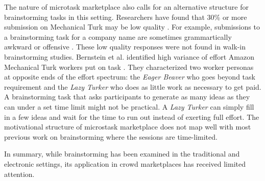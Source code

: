 The nature of microtask marketplace also calls for an alternative structure for brainstorming tasks in this setting. Researchers have found that 30\% or more submission on Mechanical Turk may be low quality \cite{kittur2008crowdsourcing}. For example, submissions to a brainstorming task for a company name are sometimes grammartically awkward or offensive \cite{little2010exploring}. These low quality responses were not found in walk-in brainstorming studies. Bernstein et al. identified high variance of effort Amazon Mechanical Turk workers put on task \cite{soylent}. They characterized two worker personas at opposite ends of the effort spectrum: the {\em Eager Beaver\/} who goes beyond task requirement and the {\em Lazy Turker\/} who does as little work as necessary to get paid. A brainstorming task that asks participants to generate as many ideas as they can under a set time limit might not be practical. A {\em Lazy Turker\/} can simply fill in a few ideas and wait for the time to run out instead of exerting full effort. The motivational structure of microstask marketplace does not map well with most previous work on brainstorming where the sessions are time-limited. 



In summary, while brainstorming has been examined in the traditional and electronic settings, its application in crowd marketplaces has received limited attention. 
